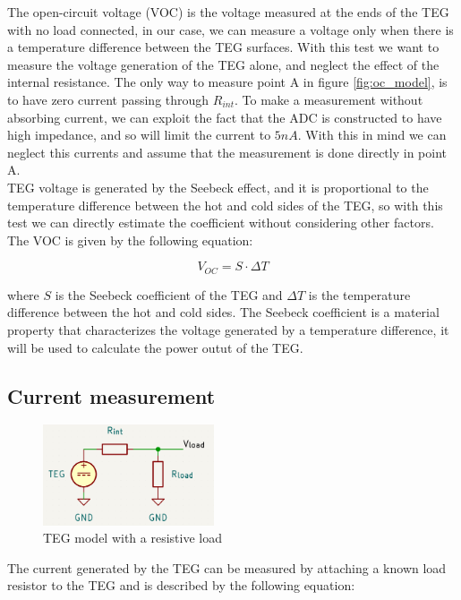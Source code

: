 The open-circuit voltage (VOC) is the voltage measured at the ends of the TEG with no load connected, in our case, we can measure a voltage only when there is a temperature difference between the TEG surfaces.
With this test we want to measure the voltage generation of the TEG alone, and neglect the effect of the internal resistance. The only way to measure point A in figure \ref{fig:oc_model}, is to have zero current passing through $R_{int}$. To make a measurement without absorbing current, we can exploit the fact that the ADC is constructed to have high impedance, and so will limit the current to $ 5 nA $. With this in mind we can neglect this currents and assume that the measurement is done directly in point A.\\
TEG voltage is generated by the Seebeck effect, and it is proportional to the temperature difference between the hot and cold sides of the TEG, so with this test we can directly estimate the coefficient without considering other factors.
\\
The VOC is given by the following equation:

\begin{equation}
  V_{OC} = S \cdot \Delta T
  \label{eq:voc}
\end{equation}

where $ S $ is the Seebeck coefficient of the TEG and $ \Delta T $ is the temperature difference between the hot and cold sides.
The Seebeck coefficient is a material property that characterizes the voltage generated by a temperature difference, it will be used to calculate the power outut of the TEG.

\subsection{Current measurement}

\begin{figure}[h]
  \centering
  \includegraphics[width=0.45\textwidth]{assets/load_circuit.png}
  \caption{TEG model with a resistive load}
\end{figure}

The current generated by the TEG can be measured by attaching a known load resistor to the TEG and is described by the following equation:

